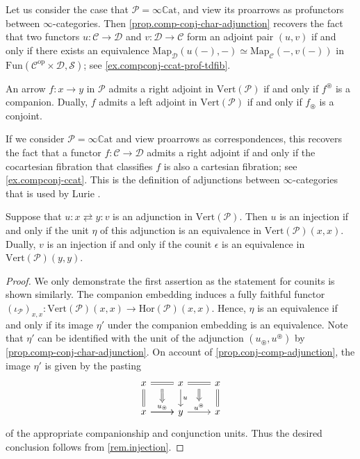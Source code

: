 \documentclass[a4paper, 11pt]{amsart}
\numberwithin{theorem}{section}
\theoremstyle{definition}
\newcommand{\op}{\mathrm{op}}
\newcommand{\map}{\mathrm{Map}}
\newcommand{\fun}{\mathrm{Fun}}
\renewcommand{\S}{\mathscr{S}}
\newcommand{\C}{\mathscr{C}}
\renewcommand{\D}{\mathscr{D}}
\renewcommand{\P}{\mathscr{P}}
\renewcommand{\Vert}{\mathrm{Vert}}
\newcommand{\Hor}{\mathrm{Hor}}
\newcommand{\CCAT}{\mathbb{C}\mathrm{at}}
\begin{document}
\begin{example}\label{ex.hom-char}
	Let us consider the case that $\P = \infty\CCAT$, and view its proarrows as profunctors between $\infty$-categories. Then \cref{prop.comp-conj-char-adjunction} recovers the fact that
	two functors $u : \C \rightarrow \D$ and $v: \D \rightarrow \C$ form an adjoint pair $(u,v)$ if and only if 
	there exists an equivalence 
	$
	\map_\D(u(-), -) \simeq \map_\C(-, v(-))
	$
	in $\fun(\C^\op \times \D , \S)$; see \cref{ex.compconj-ccat-prof-tdfib}. 
\end{example}

\begin{corollary}\label{cor.comp-conj-char-adjunction}
	An arrow $f : x\rightarrow y$ in $\P$ admits a right adjoint in $\Vert(\P)$ if and only if $f^\circledast$ is a companion. Dually, $f$ admits a left adjoint in $\Vert(\P)$ if and only if 
	$f_\circledast$ is a conjoint.
\end{corollary}

\begin{remark}
	If we consider $\P = \infty\CCAT$ and view proarrows as correspondences, this recovers the fact that 
	a functor $f : \C \rightarrow \D$  admits a right adjoint if and only if the cocartesian fibration that classifies 
	$f$ is also a cartesian fibration; see \cref{ex.compconj-ccat}. This is the definition of adjunctions between $\infty$-categories that is used by Lurie \cite[Definition 5.2.2.1]{HTT}.
\end{remark}

\begin{proposition}\label{prop.ff-adjoints}
	Suppose that 
	$
	u : x \rightleftarrows y : v
	$
	is an adjunction in $\Vert(\P)$. Then $u$ is an injection if and only if the unit  $\eta$ of this adjunction is an equivalence in $\Vert(\P)(x,x)$. Dually, 
	$v$ is an injection if and only if the counit $\epsilon$ is an equivalence in $\Vert(\P)(y,y)$.
\end{proposition}
\begin{proof}
	We only demonstrate the first assertion as the statement for counits is shown similarly.
	The companion embedding induces a fully faithful functor 
	$(\iota_\P)_{x,x}:\Vert(\P)(x,x) \rightarrow \Hor(\P)(x,x)$. Hence, $\eta$ is an equivalence if and only if its image $\eta'$ under the companion embedding is an equivalence.
	Note that $\eta'$ can be identified with the unit of the adjunction $(u_\circledast, u^\circledast)$ by \cref{prop.comp-conj-char-adjunction}.
	On account of \cref{prop.conj-comp-adjunction}, the image $\eta'$ is given by the pasting
	\[
		\begin{tikzcd}
			x \arrow[r, equal, ""name=h1]\arrow[d, equal] & x \arrow[r, equal, ""name=h3] \arrow[d, "u"] & x \arrow[d,equal] \\
			x \arrow[r, "u_\circledast"name=h2] \arrow[r] & y \arrow[r, "u^\circledast"name=h4] & x 
			\arrow[from=h1,to=h2, Rightarrow, shorten <= 6pt]
			\arrow[from=h3,to=h4, Rightarrow, shorten <= 6pt]
		\end{tikzcd}
	\]
	of the appropriate companionship and conjunction units. Thus the desired conclusion follows from \cref{rem.injection}.
\end{proof}
\end{document}
